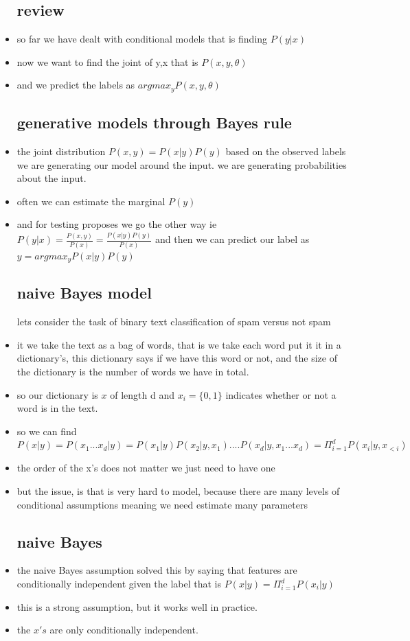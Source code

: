 \documentclass{article}
\begin{document}
\begin{itemize}
\subsection{review}
\item so far we have dealt with conditional models that is finding $P(y|x)$
\item now we want to find the joint of y,x that is $P(x,y,\theta)$
\item and we predict the labels as $argmax_{y}P(x,y,\theta)$
\subsection{generative models through Bayes rule}
\item the joint distribution $P(x,y)=P(x|y)P(y)$ based on the observed labels we are generating our model around the input. we are generating probabilities about the input. 
\item often we can estimate the marginal $P(y)$
\item and for testing proposes we go the other way ie  $P(y|x)=\frac{P(x,y)}{P(x)}=\frac{P(x|y)P(y)}{P(x)}$
\teim and then we can predict our label as $y=argmax_{y}P(x|y)P(y)$ 
\subsection{naive Bayes model}
\itemm lets consider the task of binary text classification of spam versus not spam 
\item it we take the text as a bag of words, that is we take each word put it it in a dictionary's, this dictionary says if we have this word or not, and the size of the dictionary is the number of words we have in total. 
\item so our dictionary is $x$ of length d and $x_i=\{0,1\}$ indicates whether or not a word is in the text. 
\item so we can find $P(x|y)=P(x_1...x_d|y)=P(x_1|y)P(x_2|y,x_1)....P(x_d|y,x_1...x_d)=\Pi_{i=1}^{d}P(x_i|y,x_{<i})$
\item the order of the x's does not matter we just need to have one 
\item but the issue, is that is very hard to model, because there are many levels of conditional assumptions meaning we need estimate many parameters
\subsection{naive Bayes}
\item the naive Bayes assumption solved this by saying that features are conditionally independent given the label that is $P(x|y)=\Pi_{i=1}^{d}P(x_i|y)$
\item this is a strong assumption, but it works well in practice. 
\item the $x's$ are only conditionally independent.

\end{itemize}
\end{document}
